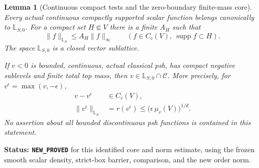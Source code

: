 \documentclass[11pt,a4paper]{article}
\numberwithin{equation}{section}
\newtheorem{lemma}[theorem]{Lemma}
\theoremstyle{definition}
\theoremstyle{remark}
\begin{document}
\begin{lemma}[Continuous compact tests and the zero-boundary finite-mass core]
\label{lem:r12-continuous-compact-core}
Every actual continuous compactly supported scalar function belongs
canonically to $\mathbb L_{S,0}$. For a compact set $H\Subset V$ there
is a finite $A_H$ such that
\[
       \|f\|_{\mathbb L_S}\leq A_H\|f\|_\infty
                   \qquad(f\in C_c(V),\ \operatorname{supp}f\subset H).
 \tag{CS2}
\]
The space $\mathbb L_{S,0}$ is a closed vector sublattice.

If $v<0$ is bounded, continuous, actual classical psh, has compact
negative sublevels and finite total top mass, then
$v\in\mathbb L_{S,0}\cap\mathscr C$. More precisely, for
$v^\epsilon=\max(v,-\epsilon)$,
\[
 \begin{split}
 v-v^\epsilon&\in C_c(V),\\
 \|v^\epsilon\|_{\mathbb L_S}
   &=r(v^\epsilon)\leq
            \bigl(\epsilon\,\mu_v(V)\bigr)^{1/d}.
 \end{split}
 \tag{CS3}
\]
No assertion about all bounded discontinuous psh functions is
contained in this statement.
\end{lemma}

\noindent\textbf{Status: \texttt{NEW\_PROVED}} for this identified
core and norm estimate, using the frozen smooth scalar density,
strict-box barrier, comparison, and the new order norm.
\end{document}
